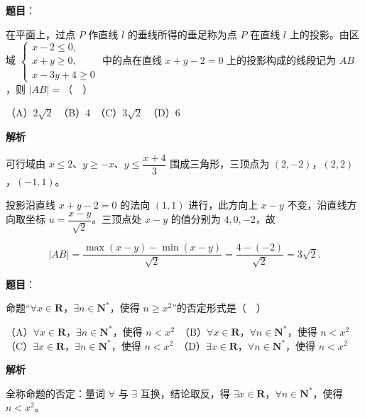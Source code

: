 \begin{answer}

\textbf{题目}：

在平面上，过点 \(P\) 作直线 \(l\) 的垂线所得的垂足称为点 \(P\) 在直线 \(l\) 上的投影。由区域 \(\begin{cases} x-2\leqslant 0, \\ x+y\geqslant 0, \\ x-3y+4\geqslant 0 \end{cases}\) 中的点在直线 \(x+y-2=0\) 上的投影构成的线段记为 \(AB\)，则 \(|AB|=\)（　）

（A）\(2\sqrt{2}\)　（B）4　（C）\(3\sqrt{2}\)　（D）6

\textbf{解析}

可行域由 \(x\leqslant 2\)、\(y\geqslant -x\)、\(y\leqslant\dfrac{x+4}{3}\) 围成三角形，三顶点为 \((2,-2)\)，\((2,2)\)，\((-1,1)\)。

投影沿直线 \(x+y-2=0\) 的法向 \((1,1)\) 进行，此方向上 \(x-y\) 不变，沿直线方向取坐标 \(u=\dfrac{x-y}{\sqrt{2}}\)。三顶点处 \(x-y\) 的值分别为 \(4,0,-2\)，故

\nopagebreak[4]
\[
|AB|=\dfrac{\max(x-y)-\min(x-y)}{\sqrt{2}}=\dfrac{4-(-2)}{\sqrt{2}}=3\sqrt{2}.
\]


\end{answer}
\begin{answer}

\textbf{题目}：

命题“\(\forall x\in\mathbf{R}\)，\(\exists n\in\mathbf{N}^{*}\)，使得 \(n\geqslant x^{2}\)”的否定形式是（　）

（A）\(\forall x\in\mathbf{R}\)，\(\exists n\in\mathbf{N}^{*}\)，使得 \(n<x^{2}\)　（B）\(\forall x\in\mathbf{R}\)，\(\forall n\in\mathbf{N}^{*}\)，使得 \(n<x^{2}\)　（C）\(\exists x\in\mathbf{R}\)，\(\exists n\in\mathbf{N}^{*}\)，使得 \(n<x^{2}\)　（D）\(\exists x\in\mathbf{R}\)，\(\forall n\in\mathbf{N}^{*}\)，使得 \(n<x^{2}\)

\textbf{解析}

全称命题的否定：量词 \(\forall\) 与 \(\exists\) 互换，结论取反，得 \(\exists x\in\mathbf{R}\)，\(\forall n\in\mathbf{N}^{*}\)，使得 \(n<x^{2}\)。


\end{answer}
